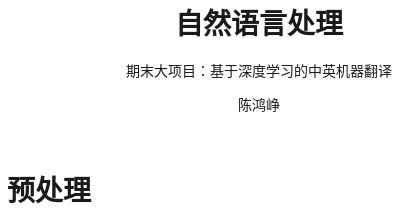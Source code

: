 \documentclass[logo,reportComp]{thesis}
\title{自然语言处理}
\subtitle{期末大项目：基于深度学习的中英机器翻译}
\author{陈鸿峥}
\begin{document}
\maketitle
\tableofcontents

\newpage

\section{预处理}


\end{document}
